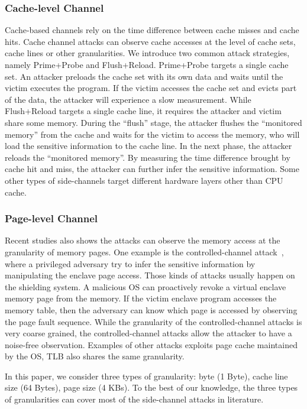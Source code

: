 \subsubsection{Cache-level Channel}
Cache-based channels rely on the time difference between cache misses and cache hits. Cache channel attacks can observe cache accesses at the level of cache sets, cache lines or other granularities.
We introduce two common attack strategies, namely Prime+Probe and
Flush+Reload. Prime+Probe targets a single cache set. An
attacker preloads the cache set with its own data and waits until the victim
executes the program. If the victim accesses the cache set and evicts part of
the data, the attacker will experience a slow measurement.
While Flush+Reload targets a single cache line, it requires the attacker and victim share some memory. During the ``flush'' stage, the attacker flushes the ``monitored
memory'' from the cache and waits for the victim to access the memory,
who will load the sensitive information to the cache line. In the next phase,
the attacker reloads the ``monitored memory''. By measuring the time difference
brought by cache hit and miss, the attacker can further infer the sensitive information. Some other types of side-channels target different hardware
layers other than CPU cache.

\subsubsection{Page-level Channel}
Recent studies also shows the attacks can observe the memory access at the granularity of memory pages. One example is the controlled-channel attack~\cite{xu2015controlled}, where a privileged adversary try to infer the sensitive information by manipulating the enclave page access. Those kinds of attacks usually happen on the shielding system. A malicious OS can proactively revoke a virtual enclave memory page from the memory. If the victim enclave program accesses the memory table, then the adversary can know which page is accessed by observing the page fault sequence. While the granularity of the controlled-channel attacks is very coarse grained, the controlled-channel attacks allow the attacker to have a noise-free observation. Examples of other attacks exploits page cache maintained by the OS, TLB also shares the same granularity.


In this paper, we consider three types of granularity: byte (1 Byte), cache line size (64 Bytes), page size (4 KBs). To the best of our knowledge, the three types of granularities can cover most of the side-channel attacks in literature.


